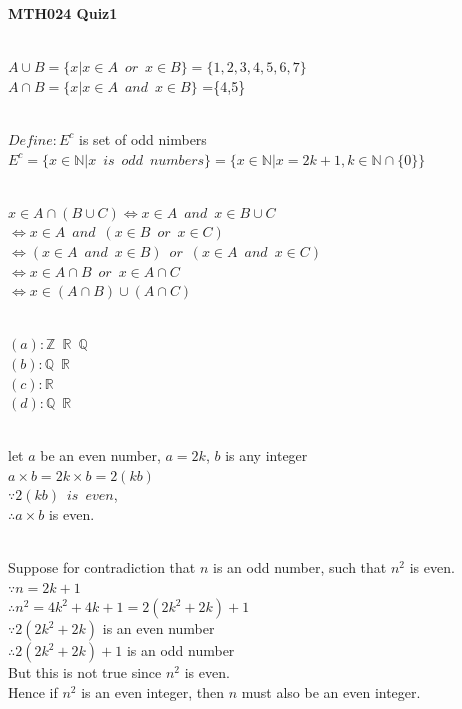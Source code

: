 \documentclass[12pt,a4paper]{article}
\begin{document}
\begin{center}
\LARGE \textbf{MTH024 Quiz1}
\end{center}

\\
$A \cup B = \{x|x \in A \;\ or \;\ x \in B\} = \{1,2,3,4,5,6,7\}$\\
$A \cap B = \{x|x \in A \;\ and \;\ x \in B\}$ =\{4,5\}

\vspace{1.5em}

\\
$Define:E^c $ is set of odd nimbers\\
$E^c = \{x\in \mathbb{N} | x\;\ is\;\ odd\;\ numbers \}=\{x\in \mathbb{N} | x=2k+1,k \in \mathbb{N} \cap \{0\}\}$

\vspace{1.5em}
\\
$ x \in A \cap(B \cup C  ) \Leftrightarrow x \in A \;\ and \;\ x \in B \cup C $\\
$\Leftrightarrow x \in A \;\ and \;\ (x\in B \;\ or \;\ x \in C) $\\
$\Leftrightarrow (x \in A \;\ and \;\ x \in B) \;\ or \;\ (x \in A \;\ and \;\ x \in C)$\\
$\Leftrightarrow x \in A \cap B \;\ or \;\ x \in A \cap C $\\
$\Leftrightarrow x \in (A \cap B)\cup (A \cap C)$

\vspace{1.5em}
\\
$(a):\mathbb{Z} \;\ \mathbb{R} \;\ \mathbb{Q} $\\
$(b):\mathbb{Q} \;\ \mathbb{R} $\\
$(c):\mathbb{R} $\\
$(d):\mathbb{Q} \;\ \mathbb{R} $

\vspace{1.5em}
\\
let $a$ be an even number, $a=2k$, $b$ is any integer\\
$a\times b=2k\times b=2(kb)$\\
$\because 2(kb) \;\ is \;\ even$,\\
$\therefore a\times b$ is even.

\vspace{1.5em}
\\
Suppose for contradiction that $n$ is an odd number, such that $n^2$ is even.\\
$\because n=2k+1$\\
$\therefore n^2=4k^2+4k+1=2(2k^2+2k)+1$\\
$\because 2(2k^2+2k)$ is an even number\\
$\therefore 2(2k^2+2k)+1$ is an odd number \\
But this is not true since $n^2$ is even.\\
Hence if $n^2$ is an even integer, then $n$ must also be an even integer.
\end{document}
